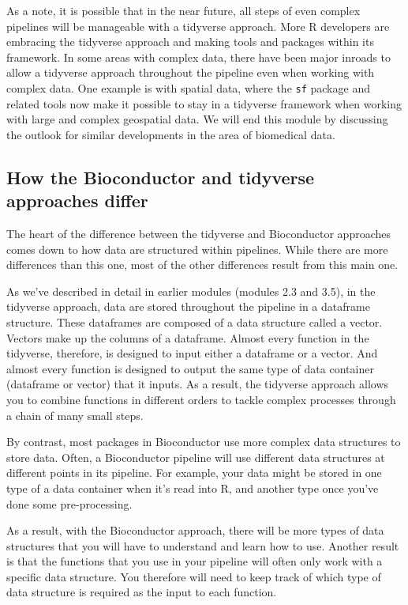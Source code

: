 \documentclass[]{tufte-book}
\begin{document}
As a note, it is possible that in the near future, all steps of even
complex pipelines will be manageable with a tidyverse approach. More
R developers are embracing the tidyverse approach and making tools and packages
within its framework. In some areas with complex data, there have been
major inroads to allow a tidyverse approach throughout the pipeline even
when working with complex data. One example is with spatial data,
where the \texttt{sf} package and related tools now make it possible to stay in
a tidyverse framework when working with large and complex geospatial data.
We will end this module by discussing the outlook for similar developments
in the area of biomedical data.

\subsection{How the Bioconductor and tidyverse approaches differ}\label{how-the-bioconductor-and-tidyverse-approaches-differ}

The heart of the difference between the tidyverse and Bioconductor approaches
comes down to how data are structured within pipelines. While there are more
differences than this one, most of the other differences result from this
main one.

As we've described in detail in earlier modules (modules 2.3 and 3.5), in the
tidyverse approach, data are stored throughout the pipeline in a dataframe
structure. These dataframes are composed of a data structure called a vector.
Vectors make up the columns of a dataframe. Almost every function in the
tidyverse, therefore, is designed to input either a dataframe or a vector. And
almost every function is designed to output the same type of data container
(dataframe or vector) that it inputs. As a result, the tidyverse approach allows
you to combine functions in different orders to tackle complex processes through
a chain of many small steps.

By contrast, most packages in Bioconductor use more complex data structures
to store data. Often, a Bioconductor pipeline will use different data
structures at different points in its pipeline. For example, your data might
be stored in one type of a data container when it's read into R, and
another type once you've done some pre-processing.

As a result, with the Bioconductor approach, there will be more types of data
structures that you will have to understand and learn how to use. Another result
is that the functions that you use in your pipeline will often only work with a
specific data structure. You therefore will need to keep track of which type of
data structure is required as the input to each function.
\end{document}

